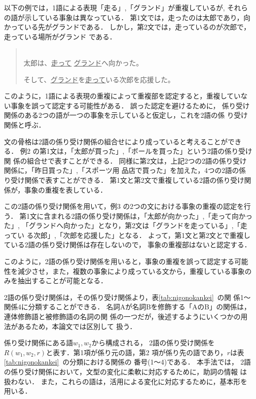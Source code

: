 以下の例では，1語による表現「走る」,「グランド」が重複しているが,
それらの語が示している事象は異なっている．
第1文では，走ったのは太郎であり，向かっている先がグランドである．
しかし，第2文では，走っているのが次郎で，走っている場所がグランド
である．
\vspace{5mm}
\begin{quote}\label{rei:rei3}
\hspace*{-1em}{\bf 例3：}\\
太郎は、\underline{走って} \underline{グランド}へ向かった。

そして、\underline{グランド}を\underline{走って}いる次郎を応援した。
\end{quote}
\vspace{5mm}
このように，1語による表現の重複によって重複部を認定すると，重複していな
い事象を誤って認定する可能性がある．
誤った認定を避けるために，
係り受け関係のある2つの語が一つの事象を示していると仮定し，これを2語の係
り受け関係と呼ぶ．

文の骨格は2語の係り受け関係の組合せにより成っていると考えることができる．
例2 の第1文は，「太郎が買った」,「ボールを買った」という2語の係り受け関
係の組合せで表すことができる．
同様に第2文は，上記2つの2語の係り受け関係に，「昨日買った」,「スポーツ用
品店で買った」を加えた，4つの2語の係り受け関係で表すことができる．
第1文と第2文で重複している2語の係り受け関係が，事象の重複を表している．

この2語の係り受け関係を用いて，例3 の2つの文における事象の重複の認定を行
う．
第1文に含まれる2語の係り受け関係は，「太郎が向かった」,「走って向かった」,
「グランドへ向かった」となり，第2文は「グランドを走っている」,「走ってい
る次郎」,「次郎を応援した」となる．
よって，第1文と第2文とで重複している2語の係り受け関係は存在しないので，
事象の重複部はないと認定する．

このように，2語の係り受け関係を用いると，事象の重複を誤って認定する可能
性を減少させ，また，複数の事象により成っている文から，重複している事象の
みを抽出することが可能となる．

2語の係り受け関係は，その係り受け関係より，表\ref{tab:nigonokankei}~の関
係1〜関係4に分類することができる．
名詞Aが名詞Bを修飾する「AのB」の関係は，連体修飾語と被修飾語の名詞の関
係の一つだが，後述するようにいくつかの用法があるため，本論文では区別して
扱う．

係り受け関係にある語$w_{1} , w_{2}$から構成される，
2語の係り受け関係を$R(w_{1} , w_{2} , r)$と表す．第1項が係り元の語，第2
項が係り先の語であり，$r$は表\ref{tab:nigonokankei}~の分類における関係の
番号(1〜4)である．
本手法では，
2語の係り受け関係において，文型の変化に柔軟に対応するために，助詞の情報
は扱わない．
また，これらの語は，活用による変化に対応するために，基本形を用いる．

